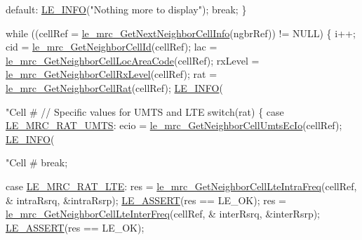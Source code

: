 \begin{DoxyCodeInclude}
{{{{            \textcolor{keywordflow}{default}:
                \hyperlink{le__log_8h_a23e6d206faa64f612045d688cdde5808}{LE\_INFO}(\textcolor{stringliteral}{"Nothing more to display"});
                \textcolor{keywordflow}{break};
        \}

        \textcolor{keywordflow}{while} ((cellRef = \hyperlink{le__mrc__interface_8h_a0baede61d9b260a3ec83e3ab320d0715}{le\_mrc\_GetNextNeighborCellInfo}(ngbrRef)) != NULL)
        \{
            i++;
            cid = \hyperlink{le__mrc__interface_8h_abdbc94e474235417d8610e2eb95558eb}{le\_mrc\_GetNeighborCellId}(cellRef);
            lac = \hyperlink{le__mrc__interface_8h_a70ba0ca70367bc673a6bca1e246bb88f}{le\_mrc\_GetNeighborCellLocAreaCode}(cellRef);
            rxLevel = \hyperlink{le__mrc__interface_8h_aeae116235802afd041afd9df009642aa}{le\_mrc\_GetNeighborCellRxLevel}(cellRef);
            rat = \hyperlink{le__mrc__interface_8h_a5bb3e75b74260a9cee57247e1968a31f}{le\_mrc\_GetNeighborCellRat}(cellRef);
            \hyperlink{le__log_8h_a23e6d206faa64f612045d688cdde5808}{LE\_INFO}(\textcolor{stringliteral}{"Cell #%
            \textcolor{comment}{// Specific values for UMTS and LTE}
            \textcolor{keywordflow}{switch}(rat)
            \{
                \textcolor{keywordflow}{case} \hyperlink{le__mrc__interface_8h_aaf23906c37ad59fb96a8a48f7fab5b43afe34c4f3a53aa717f5ecb94dd59bf728}{LE\_MRC\_RAT\_UMTS}:
                    ecio = \hyperlink{le__mrc__interface_8h_a94e452e3d7063d3359dcbb97a31b984b}{le\_mrc\_GetNeighborCellUmtsEcIo}(cellRef);
                    \hyperlink{le__log_8h_a23e6d206faa64f612045d688cdde5808}{LE\_INFO}(\textcolor{stringliteral}{"Cell #%
                    \textcolor{keywordflow}{break};

                \textcolor{keywordflow}{case} \hyperlink{le__mrc__interface_8h_aaf23906c37ad59fb96a8a48f7fab5b43aaf2b25a8ec75f9bacb51967f23247176}{LE\_MRC\_RAT\_LTE}:
                    res = \hyperlink{le__mrc__interface_8h_a7754836120c34cd2610b9777bd56409f}{le\_mrc\_GetNeighborCellLteIntraFreq}(cellRef, &
      intraRsrq, &intraRsrp);
                    \hyperlink{le__log_8h_ac0dbbef91dc0fed449d0092ff0557b39}{LE\_ASSERT}(res == LE\_OK);
                    res = \hyperlink{le__mrc__interface_8h_a331545d4e396c513bba028db981c016b}{le\_mrc\_GetNeighborCellLteInterFreq}(cellRef, &
      interRsrq, &interRsrp);
                    \hyperlink{le__log_8h_ac0dbbef91dc0fed449d0092ff0557b39}{LE\_ASSERT}(res == LE\_OK);

}}}}}}
\end{DoxyCodeInclude}
